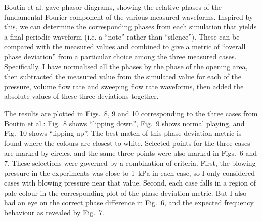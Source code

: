   Boutin et al. gave phasor diagrams, showing the relative phases of the 
  fundamental Fourier component of the various measured waveforms. Inspired by 
  this, we can determine the corresponding phases from each simulation that 
  yields a final periodic waveform (i.e. a ``note'' rather than ``silence''). 
  These can be compared with the measured values and combined to give a metric 
  of ``overall phase deviation'' from a particular choice among the three 
  measured cases. Specifically, I have normalised all the phases by the phase 
  of the opening area, then subtracted the measured value from the simulated 
  value for each of the pressure, volume flow rate and sweeping flow rate 
  waveforms, then added the absolute values of these three deviations together. 

  The results are plotted in Figs.\ 8, 9 and 10 corresponding to the three 
  cases from Boutin et al.: Fig.\ 8 shows ``lipping down'', Fig.\ 9 shows 
  normal playing, and Fig.\ 10 shows ``lipping up''. The best match of this 
  phase deviation metric is found where the colours are closest to white. 
  Selected points for the three cases are marked by circles, and the same three 
  points were also marked in Figs.\ 6 and 7. These selections were governed by 
  a combination of criteria. First, the blowing pressure in the experiments was 
  close to 1~kPa in each case, so I only considered cases with blowing pressure 
  near that value. Second, each case falls in a region of pale colour in the 
  corresponding plot of the phase deviation metric. But I also had an eye on 
  the correct phase difference in Fig.\ 6, and the expected frequency behaviour 
  as revealed by Fig.\ 7. 



